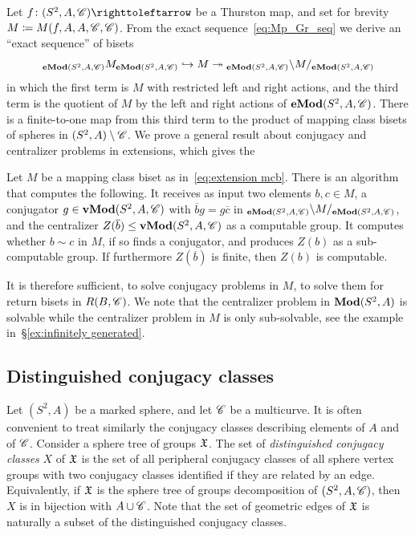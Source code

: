 \documentclass{amsart}
\begin{document}
Let $f\colon(S^2,A,\CC)\selfmap$ be a Thurston map, and set for
brevity $M\coloneqq M(f,A,A,\CC,\CC)$. From the exact
sequence~\eqref{eq:Mp_Gr_seq} we derive an ``exact sequence'' of
bisets
\begin{equation}\label{eq:extension mcb}
  \subscript{\Mod[e](S^2,A,\CC)}M_{\Mod[e](S^2,A,\CC)}\hookrightarrow M\twoheadrightarrow
  {}_{\Mod[e](S^2,A,\CC)}\backslash M/_{\Mod[e](S^2,A,\CC)}
\end{equation}
in which the first term is $M$ with restricted left and right actions,
and the third term is the quotient of $M$ by the left and right
actions of $\Mod[e](S^2,A,\CC)$. There is a finite-to-one map from
this third term to the product of mapping class bisets of spheres in
$(S^2,A)\setminus\CC$. We prove a general result about conjugacy and
centralizer problems in extensions, which gives the
\begin{thm}\label{thm:extension}
  Let $M$ be a mapping class biset as in~\eqref{eq:extension
    mcb}. There is an algorithm that computes the following. It
  receives as input two elements $b,c\in M$, a conjugator
  $g\in \Mod[v](S^2,A,\CC)$ with $\overline b g =g\overline c$ in
  ${}_{\Mod[e](S^2,A,\CC)}\backslash M/_{\Mod[e](S^2,A,\CC)}$, and the
  centralizer $Z(\overline b)\le \Mod[v](S^2,A,\CC)$ as a computable
  group. It computes whether $b\sim c$ in $M$, if so finds a
  conjugator, and produces $Z(b)$ as a sub-computable group.  If
  furthermore $Z(\overline b)$ is finite, then $Z(b)$ is computable.
\end{thm}
It is therefore sufficient, to solve conjugacy problems in $M$, to
solve them for return bisets in $R(B,\CC)$. We note that the
centralizer problem in $\Mod(S^2,A)$ is solvable while the centralizer
problem in $M$ is only sub-solvable, see the example
in~\S\ref{ex:infinitely generated}.

\subsection{Distinguished conjugacy classes}\label{ss:distinguished cc}
Let $(S^2,A)$ be a marked sphere, and let $\CC$ be a multicurve. It is
often convenient to treat similarly the conjugacy classes describing
elements of $A$ and of $\CC$. Consider a sphere tree of groups
$\gf$. The set of \emph{distinguished conjugacy classes} $X$ of $\gf$
is the set of all peripheral conjugacy classes of all sphere vertex groups
with two conjugacy classes identified if they are related by an
edge. Equivalently, if $\gf$ is the sphere tree of groups
decomposition of $(S^2,A,\CC)$, then $X$ is in bijection with
$A\cup \CC$. Note that the set of geometric edges of $\gf$ is
naturally a subset of the distinguished conjugacy classes.
\end{document}
